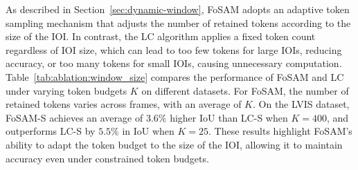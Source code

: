 \documentclass{article}
\begin{document}

As described in Section~\ref{sec:dynamic-window}, FoSAM adopts an adaptive token sampling mechanism that adjusts the number of retained tokens according to the size of the IOI. In contrast, the LC algorithm applies a fixed token count regardless of IOI size, which can lead to too few tokens for large IOIs, reducing accuracy, or too many tokens for small IOIs, causing unnecessary computation. Table~\ref{tab:ablation:window_size} compares the performance of FoSAM and LC under varying token budgets $K$ on different datasets. For FoSAM, the number of retained tokens varies across frames, with an average of $K$. On the LVIS dataset, FoSAM-S achieves an average of $3.6\%$ higher IoU than LC-S when $K = 400$, and outperforms LC-S by $5.5\%$ in IoU when $K = 25$. These results highlight FoSAM’s ability to adapt the token budget to the size of the IOI, allowing it to maintain accuracy even under constrained token budgets.
\end{document}
